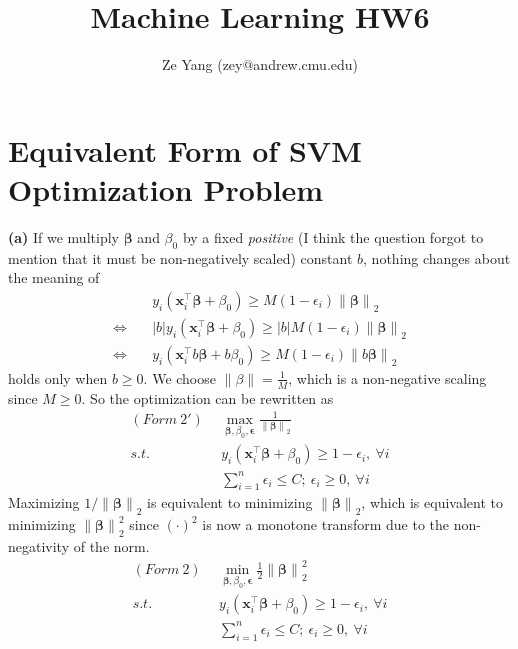 \documentclass[11pt]{article}
\title{Machine Learning HW6}
\author{Ze Yang (zey@andrew.cmu.edu)}
\begin{document}
    
    
    \maketitle

    \section{Equivalent Form of SVM Optimization Problem}
    \textbf{(a)} If we multiply $\bm{\beta}$ and $\beta_0$ by a fixed \textit{positive} (I think the question forgot to mention that it must be non-negatively scaled) constant $b$, nothing changes about the meaning of
\begin{equation}
  \begin{split}
    &y_i(\bm{x}_i^{\top} \bm{\beta} + \beta_0) \geq M(1- \epsilon_i) \left\lVert \bm{\beta}\right\rVert_2\\
    \iff \quad & |b|y_i(\bm{x}_i^{\top} \bm{\beta} + \beta_0) \geq |b|M(1- \epsilon_i) \left\lVert \bm{\beta}\right\rVert_2\\
    \iff \quad & y_i(\bm{x}_i^{\top} b\bm{\beta} + b\beta_0) \geq M(1- \epsilon_i) \left\lVert b\bm{\beta}\right\rVert_2
  \end{split}
\end{equation}
holds only when $b\geq 0$. We choose $\left\lVert \beta \right\rVert = \frac{1}{M}$, which is a non-negative scaling since $M\geq 0$. So the optimization can be rewritten as
\begin{equation}
  \begin{split}
    (Form~2')~~ &\max\limits_{\bm{\beta}, \beta_0, \bm{\epsilon}} \frac{1}{\left\lVert \bm{\beta} \right\rVert_2}\\
    s.t. \quad & y_i(\bm{x}_i^{\top} \bm{\beta} + \beta_0) \geq 1- \epsilon_i, ~\forall i \\
    & \sum_{i=1}^n \epsilon_i \leq C; ~\epsilon_i \geq 0, ~\forall i
  \end{split}
\end{equation}
Maximizing $1/ \left\lVert \bm{\beta} \right\rVert_2$ is equivalent to minimizing $\left\lVert \bm{\beta} \right\rVert_2$, which is equivalent to minimizing $\left\lVert \bm{\beta} \right\rVert^2_2$ since $(\cdot)^2$ is now a monotone transform due to the non-negativity of the norm.
\begin{equation}
  \begin{split}
    (Form~2)~~ &\min\limits_{\bm{\beta}, \beta_0, \bm{\epsilon}} \frac{1}{2}\left\lVert \bm{\beta} \right\rVert^2_2\\
    s.t. \quad & y_i(\bm{x}_i^{\top} \bm{\beta} + \beta_0) \geq 1- \epsilon_i, ~\forall i \\
    & \sum_{i=1}^n \epsilon_i \leq C; ~\epsilon_i \geq 0, ~\forall i
  \end{split}
\end{equation}
\end{document}
